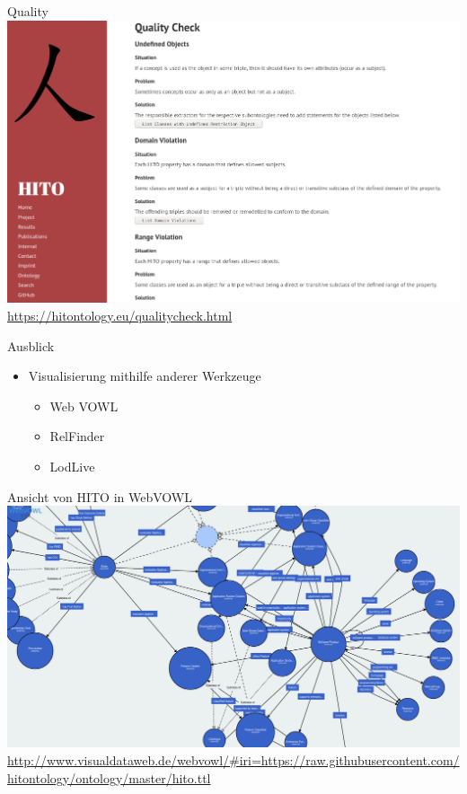 \documentclass[aspectratio=1610,12pt]{beamer}
\begin{document}
\begin{frame}{Quality}
  \vspace{-0.3cm}
  \centering
  \includegraphics[height=.75\textheight]{img/qualitychecker.png}
  \footnotesize{\url{https://hitontology.eu/qualitycheck.html}}
\end{frame}

\begin{frame}{Ausblick}
\begin{spacing}{1.5}
\begin{itemize}
  \item Visualisierung mithilfe anderer Werkzeuge
  \begin{itemize}
    \item Web VOWL
    \item RelFinder
    \item LodLive
  \end{itemize}
\end{itemize}
\end{spacing}
\end{frame}

\begin{frame}{Ansicht von HITO in WebVOWL}
  \vspace{-0.3cm}
  \centering
  \includegraphics[width=.95\textwidth]{img/webvowl.png}
  \footnotesize{\url{http://www.visualdataweb.de/webvowl/\#iri=https://raw.githubusercontent.com/hitontology/ontology/master/hito.ttl}}
\end{frame}
\end{document}
